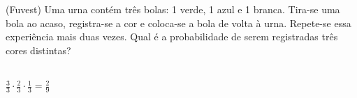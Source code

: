 \begin{ex}
(Fuvest) Uma urna contém três bolas: 1 verde, 1 azul e 1 branca. Tira-se uma bola ao acaso, registra-se a cor e coloca-se a bola de volta à urna. Repete-se essa experiência mais duas vezes. Qual é a probabilidade de serem registradas três cores distintas?
  \begin{sol}
   \phantom{A} \\
   $\frac{3}{3}\cdot\frac{2}{3}\cdot\frac{1}{3}=\frac{2}{9}$
  \end{sol}
\end{ex}